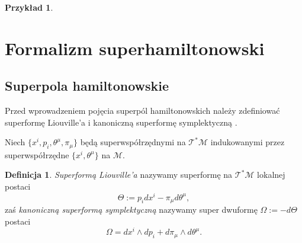 \documentclass[11pt,a4paper]{report}
\theoremstyle{definition}
\newtheorem{example}[theorem]{Przykład}
\newtheorem{definition}[theorem]{Definicja}
\begin{document}
\begin{example}
\end{example}

\section{Formalizm superhamiltonowski}

\subsection{Superpola hamiltonowskie}

Przed wprowadzeniem pojęcia superpól hamiltonowskich należy zdefiniować superformę Liouville'a i kanoniczną superformę symplektyczną \cite{carinena,Ko77}.

Niech $\{ x^i, p_i, \theta^\mu, \pi_\mu \}$ będą superwspółrzędnymi na $\mathcal{T^*M}$ indukowanymi przez superwspółrzędne $\{ x^i, \theta^\mu\}$ na $\mathcal{M}$.

\begin{definition}
 \textit{Superformą Liouville'a} nazywamy superformę na $\mathcal{T^*M}$ lokalnej postaci 
 \begin{equation*}
  \Theta := p_i dx^i - \pi_\mu d \theta^\mu,
 \end{equation*}
 zaś \textit{kanoniczną superformą symplektyczną} nazywamy super dwuformę $\Omega := -d\Theta$ postaci
  \begin{equation*}
  \Omega = dx^i\wedge dp_i+d\pi_\mu \wedge d\theta^\mu.
 \end{equation*}
\end{definition}
\end{document}
